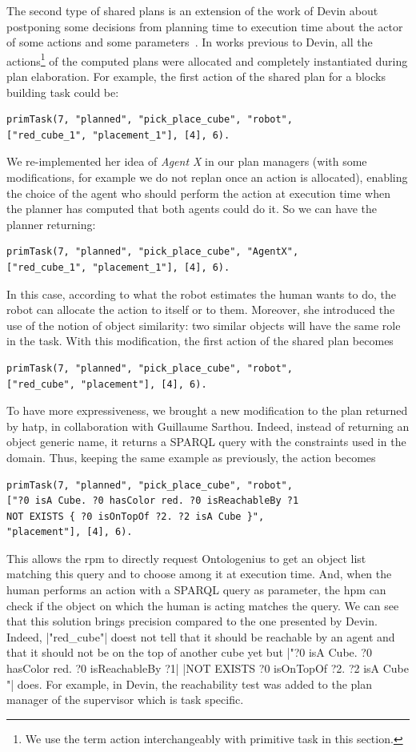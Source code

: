\documentclass[a4paper,11pt,twoside]{StyleThese}
\begin{document}
The second type of shared plans is an extension of the work of Devin about postponing some decisions from planning time to execution time about the actor of some actions and some parameters~\cite{devin_2017_decisions}. In works previous to Devin, all the actions\footnote{We use the term action interchangeably with primitive task in this section.} of the computed plans were
allocated and completely instantiated during plan elaboration. For example, the first action of the shared plan for a blocks building task could be: 
\begin{lstlisting}[style=inline]
primTask(7, "planned", "pick_place_cube", "robot", 
["red_cube_1", "placement_1"], [4], 6).
\end{lstlisting}
We re-implemented her idea of \emph{Agent X} in our plan managers (with some modifications, for example we do not replan once an action is allocated), enabling the choice of the agent who should perform the action at execution time when the planner has computed that both agents could do it. So we can have the planner returning:
\begin{lstlisting}[style=inline]
primTask(7, "planned", "pick_place_cube", "AgentX", 
["red_cube_1", "placement_1"], [4], 6).
\end{lstlisting} 
In this case, according to what the robot estimates the human wants to do, the robot can allocate the action to itself or to them. Moreover, she introduced the use of the notion of object similarity: two similar objects will have the same role in the task. With this modification, the first action of the shared plan becomes
\begin{lstlisting}[style=inline]
primTask(7, "planned", "pick_place_cube", "robot", 
["red_cube", "placement"], [4], 6).
\end{lstlisting}
To have more expressiveness, we brought a new modification to the plan returned by \acrshort{hatp}, in collaboration with Guillaume Sarthou. Indeed, instead of returning an object generic name, it returns a SPARQL query with the constraints used in the domain. Thus, keeping the same example as previously, the action becomes
\begin{lstlisting}[style=inline]
primTask(7, "planned", "pick_place_cube", "robot", 
["?0 isA Cube. ?0 hasColor red. ?0 isReachableBy ?1 
NOT EXISTS { ?0 isOnTopOf ?2. ?2 isA Cube }", 
"placement"], [4], 6).
\end{lstlisting}
This allows the \acrshort{rpm} to directly request Ontologenius to get an object list matching this query and to choose among it at execution time. And, when the human performs an action with a SPARQL query as parameter, the \acrshort{hpm} can check if the object on which the human is acting matches the query. We can see that this solution brings precision compared to the one presented by Devin. Indeed, |"red_cube"| doest not tell that it should be reachable by an agent and that it should not be on the top of another cube yet but |"?0 isA Cube. ?0 hasColor red. ?0 isReachableBy ?1| |NOT EXISTS { ?0 isOnTopOf ?2. ?2 isA Cube }"| does. For example, in Devin, the reachability test was added to the plan manager of the supervisor which is task specific. 
\end{document}
